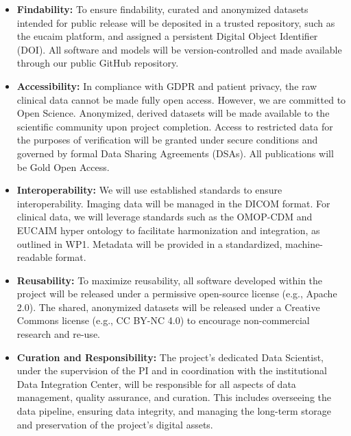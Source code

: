 \documentclass[11pt, a4paper]{article}
\begin{document}
\begin{itemize}

    \item \textbf{Findability:} To ensure findability, curated and anonymized datasets intended for public release will be deposited in a trusted repository, such as the \gls{eucaim} platform, and assigned a persistent Digital Object Identifier (DOI). All software and models will be version-controlled and made available through our public GitHub repository.
    \item \textbf{Accessibility:} In compliance with GDPR and patient privacy, the raw clinical data cannot be made fully open access. However, we are committed to Open Science. Anonymized, derived datasets will be made available to the scientific community upon project completion. Access to restricted data for the purposes of verification will be granted under secure conditions and governed by formal Data Sharing Agreements (DSAs). All publications will be Gold Open Access.
    \item \textbf{Interoperability:} We will use established standards to ensure interoperability. Imaging data will be managed in the DICOM format. For clinical data, we will leverage standards such as the OMOP-CDM and EUCAIM hyper ontology to facilitate harmonization and integration, as outlined in WP1. Metadata will be provided in a standardized, machine-readable format.
    \item \textbf{Reusability:} To maximize reusability, all software developed within the project will be released under a permissive open-source license (e.g., Apache 2.0). The shared, anonymized datasets will be released under a Creative Commons license (e.g., CC BY-NC 4.0) to encourage non-commercial research and re-use.
    \item \textbf{Curation and Responsibility:} The project's dedicated Data Scientist, under the supervision of the PI and in coordination with the institutional Data Integration Center, will be responsible for all aspects of data management, quality assurance, and curation. This includes overseeing the data pipeline, ensuring data integrity, and managing the long-term storage and preservation of the project's digital assets.
\end{itemize}
\end{document}
